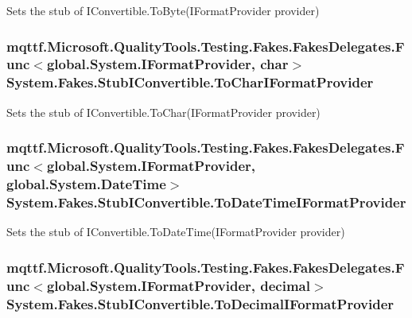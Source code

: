 Sets the stub of I\-Convertible.\-To\-Byte(\-I\-Format\-Provider provider)

\hypertarget{class_system_1_1_fakes_1_1_stub_i_convertible_a581fc7861c2e91176f9d485ace33c9ae}{
\subsubsection[{To\-Char\-I\-Format\-Provider}]{\setlength{\rightskip}{0pt plus 5cm}mqttf.\-Microsoft.\-Quality\-Tools.\-Testing.\-Fakes.\-Fakes\-Delegates.\-Func$<$global.\-System.\-I\-Format\-Provider, char$>$ System.\-Fakes.\-Stub\-I\-Convertible.\-To\-Char\-I\-Format\-Provider}}\label{class_system_1_1_fakes_1_1_stub_i_convertible_a581fc7861c2e91176f9d485ace33c9ae}


Sets the stub of I\-Convertible.\-To\-Char(\-I\-Format\-Provider provider)

\hypertarget{class_system_1_1_fakes_1_1_stub_i_convertible_a34abca04fa1bcb73e1e14484fb264b03}{
\subsubsection[{To\-Date\-Time\-I\-Format\-Provider}]{\setlength{\rightskip}{0pt plus 5cm}mqttf.\-Microsoft.\-Quality\-Tools.\-Testing.\-Fakes.\-Fakes\-Delegates.\-Func$<$global.\-System.\-I\-Format\-Provider, global.\-System.\-Date\-Time$>$ System.\-Fakes.\-Stub\-I\-Convertible.\-To\-Date\-Time\-I\-Format\-Provider}}\label{class_system_1_1_fakes_1_1_stub_i_convertible_a34abca04fa1bcb73e1e14484fb264b03}


Sets the stub of I\-Convertible.\-To\-Date\-Time(\-I\-Format\-Provider provider)

\hypertarget{class_system_1_1_fakes_1_1_stub_i_convertible_a8dbe733e6b0788fcb25459f45af5b021}{
\subsubsection[{To\-Decimal\-I\-Format\-Provider}]{\setlength{\rightskip}{0pt plus 5cm}mqttf.\-Microsoft.\-Quality\-Tools.\-Testing.\-Fakes.\-Fakes\-Delegates.\-Func$<$global.\-System.\-I\-Format\-Provider, decimal$>$ System.\-Fakes.\-Stub\-I\-Convertible.\-To\-Decimal\-I\-Format\-Provider}}\label{class_system_1_1_fakes_1_1_stub_i_convertible_a8dbe733e6b0788fcb25459f45af5b021}


